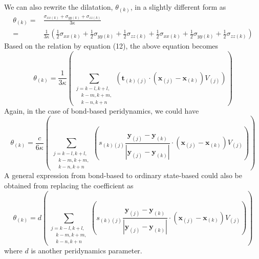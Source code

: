 \documentclass[a4paper,11pt,CJK]{paper}
\newcommand{\bfxj}{\textbf{x}_{(j)}}
\newcommand{\bfyj}{\textbf{y}_{(j)}}
\newcommand{\bfxk}{\textbf{x}_{(k)}}
\newcommand{\bfyk}{\textbf{y}_{(k)}}
\newcommand{\skj}{s_{(k)(j)}}
\newcommand{\tkj}{\textbf{t}_{(k)(j)}}
\newcommand{\thetak}{\theta_{(k)}}
\begin{document}
We can also rewrite the dilatation, $\thetak$, in a slightly different form as
\begin{equation}
\begin{aligned}
\thetak =& \frac{\sigma_{xx(k)}+\sigma_{yy(k)}+\sigma_{zz(k)}}{3\kappa}\\
        =& \frac{1}{3\kappa}(\frac{1}{2}\sigma_{xx(k)}+\frac{1}{2}\sigma_{yy(k)}+\frac{1}{2}\sigma_{zz(k)}
         + \frac{1}{2}\sigma_{xx(k)}+\frac{1}{2}\sigma_{yy(k)}+\frac{1}{2}\sigma_{zz(k)})
\end{aligned}
\end{equation}
Based on the relation by equation (12), the above equation becomes
\begin{equation}
\thetak = \frac{1}{3\kappa}\left(\sum_{\substack {j=k-l,k+l,\\ \quad k-m,k+m,\\ \quad k-n,k+n}}(\tkj\cdot(\bfxj-\bfxk)V_{(j)})\right)
\end{equation}
Again, in the case of bond-based peridynamics, we could have
\begin{equation}
\thetak = \frac{c}{6\kappa}\left(\sum_{\substack {j=k-l,k+l,\\ \quad k-m,k+m,\\ \quad k-n,k+n}}\left(\skj\frac{\bfyj - \bfyk}{|\bfyj - \bfyk|}\cdot(\bfxj-\bfxk)V_{(j)}\right)\right)
\end{equation}
A general expression from bond-based to ordinary state-based could also be obtained from replacing the coefficient as
\begin{equation}
\thetak = d\left(\sum_{\substack {j=k-l,k+l,\\ \quad k-m,k+m,\\ \quad k-n,k+n}}\left(\skj\frac{\bfyj - \bfyk}{|\bfyj - \bfyk|}\cdot(\bfxj-\bfxk)V_{(j)}\right)\right)
\end{equation}
where $d$ is another peridynamics parameter.
\end{document}
